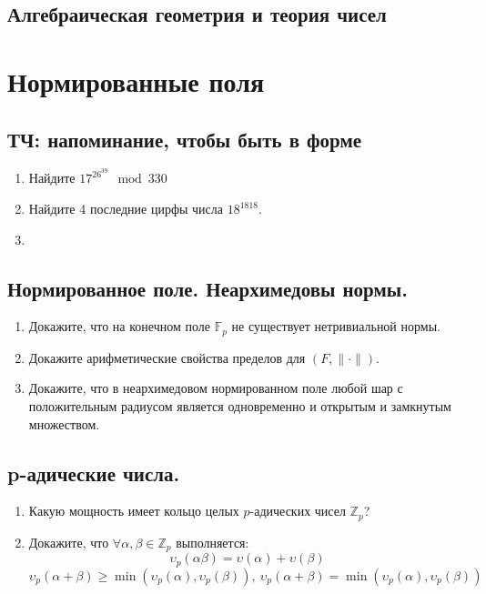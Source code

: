 \documentclass[11pt]{article}
\begin{document}
\begin{center}
        \section*{Алгебраическая геометрия и теория чисел}
    \end{center}
    \tableofcontents
    \newpage

    \section{Нормированные поля}
    \subsection{ТЧ: напоминание, чтобы быть в форме}
    \begin{enumerate}[start=1,label={\bfseries \arabic*.}]
        \item Найдите $17^{26^{39}} \mod{330}$

        \item Найдите 4 последние цирфы числа $18^{1818}$.

        \item
    \end{enumerate}
    \subsection{Нормированное поле. Неархимедовы нормы.}
    \begin{enumerate}[start=1,label={\bfseries \arabic*.}]
        \item Докажите, что на конечном поле $\mathbb{F}_{p}$ не существует нетривиальной нормы.

        \item Докажите арифметические свойства пределов для $(F, \| \cdot \|)$.

        \item Докажите, что в неархимедовом нормированном поле любой шар с положительным радиусом является одновременно и открытым
              и замкнутым множеством.
    \end{enumerate}
    \subsection{p-адические числа.}
    \begin{enumerate}[start=4,label={\bfseries \arabic*.}]
        \item Какую мощность имеет кольцо целых $p$-адических чисел $\mathbb{Z}_p$?

        \item Докажите, что $\forall \alpha, \beta \in \mathbb{Z}_p$ выполняется:
              \[ \upsilon_p(\alpha \beta) = \upsilon(\alpha) + \upsilon(\beta) \]
              \[ \upsilon_p(\alpha + \beta) \ge \min(\upsilon_p(\alpha), \upsilon_p(\beta)), \ \upsilon_p(\alpha + \beta) = \min(\upsilon_p(\alpha), \upsilon_p(\beta)) \]
    \end{enumerate}
\end{document}
